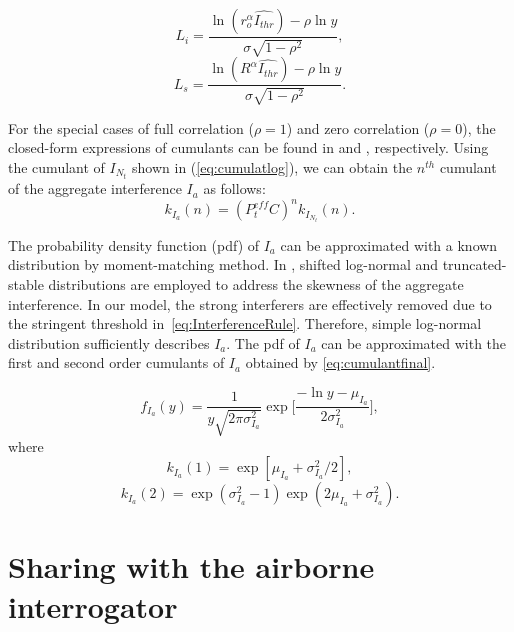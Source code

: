 \documentclass[12pt,submission,journal,onecolumn]{IEEEtran}
\begin{document}
\begin{equation*}
L_{i} = \frac{\ln(r_{o}^\alpha  \hat{I_{thr}})-\rho \ln y}{\sigma \sqrt{1-\rho^2}},
\end{equation*}
\begin{equation*}
L_{s} = \frac{\ln(R^\alpha  \hat{I_{thr}})-\rho \ln y}{\sigma \sqrt{1-\rho^2}}.
\end{equation*}

For the special cases of full correlation ($\rho = 1$) and zero correlation ($\rho = 0$), the closed-form expressions of cumulants can be found in \cite{gs0801} and \cite{5701700}, respectively. Using the cumulant of $I_{N_{t}}$ shown in (\ref{eq:cumulatlog}), we can obtain the $n^{th}$ cumulant of the aggregate interference $I_{a}$ as follows:
\begin{equation}
\label{eq:cumulantfinal}
k_{I_{a}} (n) = (P_{t}^{eff} C)^n k_{I_{N_{t}}} (n).
\end{equation}

The probability density function (pdf) of $I_{a}$ can be approximated with a known distribution by moment-matching method. In \cite{gs0801,5701700}, shifted log-normal and truncated-stable distributions are employed to address the skewness of the aggregate interference. In our model, the strong interferers are effectively removed due to the stringent threshold in~\eqref{eq:InterferenceRule}. Therefore, simple log-normal distribution sufficiently describes $I_{a}$. The pdf of $I_{a}$ can be approximated with the first and second order cumulants of $I_{a}$ obtained by \eqref{eq:cumulantfinal}.

\begin{equation}
\label{eq:ground_fIa}
f_{I_{a}} (y) = \frac{1}{y\sqrt{2\pi\sigma_{I_{a}}^2}} \exp\biggl[\frac{-\ln y -\mu_{I_{a}}}{2\sigma_{I_{a}}^2}\biggl],
\end{equation}
where
\begin{equation}
k_{I_{a}}(1) = \exp[\mu_{I_{a}}+\sigma_{I_{a}}^2/2],
\end{equation}
\begin{equation}
k_{I_{a}}(2) = \exp(\sigma_{I_{a}}^2-1)\exp(2\mu_{I_{a}}+\sigma_{I_{a}}^2).
\end{equation}

\section{Sharing with the airborne interrogator}
\label{sec:interferenceAirborne}
\end{document}
